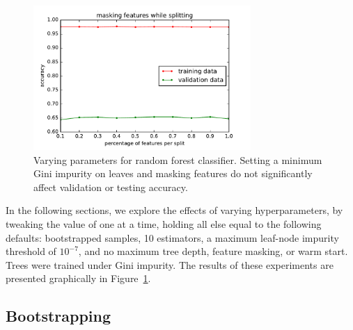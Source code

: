 \documentclass{article}
\newcommand\halfwidth{3.25in}
\begin{document}
\begin{multicols}{2}
\begin{figure}[t]
   \includegraphics[width=\halfwidth]{img/rf-maskingFeatures.pdf}
   \caption{Varying parameters for random forest classifier.
     Setting a minimum Gini impurity on leaves and masking features
     do not significantly affect validation or testing accuracy.}
   \label{fig:rf-params}
\end{figure}


In the following sections,
we explore the effects of varying hyperparameters,
by tweaking the value of one at a time,
holding all else equal to the following defaults:
bootstrapped samples,
10 estimators,
a maximum leaf-node impurity threshold of $10^{-7}$,
and no maximum tree depth,
feature masking, or warm start.
Trees were trained under Gini impurity.
The results of these experiments
are presented graphically in Figure~\ref{fig:rf-params}.

\subsection{Bootstrapping}


\end{multicols}
\end{document}
